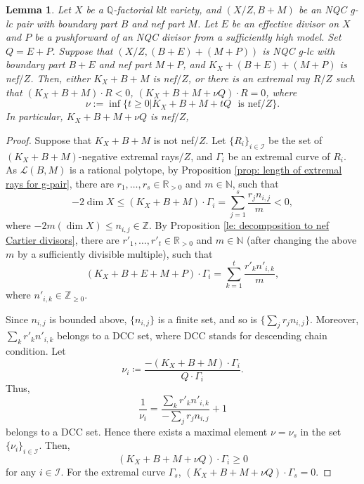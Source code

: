 \documentclass[11pt]{amsart}
\newcommand{\Zz}{\mathbb{Z}}
\newcommand{\Rr}{\mathbb{R}}
\newcommand{\Qq}{\mathbb{Q}}
\newcommand{\Nn}{\mathbb{N}}
\newcommand{\Ii}{\mathcal{I}}
\newcommand{\Ll}{\mathcal{L}}
\newtheorem{lemma}[theorem]{Lemma}
\begin{document}
\begin{lemma}\label{lem:MMPscalingNQC}
	Let $X$ be a $\Qq$-factorial klt variety, and $(X/Z,B+M)$ be an NQC g-lc pair with boundary part $B$ and nef part $M$. Let $E$ be an effective divisor on $X$ and $P$ be a pushforward of an NQC divisor from a sufficiently high model. Set $Q=E+P$. Suppose that $(X/Z,(B+E)+(M+P))$ is NQC g-lc with boundary part $B+E$ and nef part $M+P$, and $K_X+(B+E)+(M+P)$ is nef$/Z$. Then, either $K_X+B+M$ is nef$/Z$, or there is an extremal ray $R/Z$ such that $(K_X+B+M)\cdot R<0$, $(K_X+B+M+\nu Q)\cdot R=0$, where
	\[
	\nu:=\inf\{t\ge0| K_X+B+M+tQ \text{~ is nef}/Z\}.
	\] In particular, $K_X+B+M+\nu Q$ is nef$/Z$, 
\end{lemma}
\begin{proof}
	Suppose that $K_X+B+M$ is not nef$/Z$. Let $\{R_i\}_{i\in\Ii}$ be the set of $(K_X+B+M)$-negative extremal rays$/Z$, and $\Gamma_i$ be an extremal curve of $R_i$. 
	As $\Ll(B, M)$ is a rational polytope, by Proposition \ref{prop: length of extremal rays for g-pair}, there are $r_1,\ldots,r_s \in \Rr_{>0}$ and $m \in \Nn$, such that
	\[-2\dim X\le (K_X+B+M)\cdot\Gamma_i=\sum_{j=1}^s\frac{r_j n_{i,j}}{m}<0,\] where $-2m(\dim X)\le n_{i,j}\in\Zz$. By Proposition \ref{le: decomposition to nef Cartier divisors}, there are $r'_1,\ldots,r'_t \in \Rr_{>0}$ and $m \in \Nn$ (after changing the above $m$ by a sufficiently divisible multiple), such that
	\[(K_X+B+E+M+P)\cdot\Gamma_i=\sum_{k=1}^t \frac{r'_kn'_{i,k}}{m},\] where $n'_{i,k}\in\Zz_{\geq 0}$. 
	
	Since $n_{i,j}$ is bounded above, $\{n_{i,j}\}$ is a finite set, and so is $\{\sum_{j}r_j n_{i,j}\}$. Moreover, $\sum_{k} r'_kn'_{i,k}$ belongs to a DCC set, where DCC stands for descending chain condition.
	Let 
	\[\nu_i\coloneqq\frac{-(K_X+B+M)\cdot \Gamma_i}{Q\cdot \Gamma_i}.\]
	Thus, 
	\[\frac{1}{\nu_i}=\frac{\sum_{k} r'_kn'_{i,k}}{-\sum_{j}r_j n_{i,j}}+1\]
	belongs to a DCC set. Hence there exists a maximal element $\nu=\nu_s$ in the set $\{\nu_i\}_{i\in\Ii}$. Then,
	\[(K_X+B+M+\nu Q)\cdot \Gamma_i\ge0\]
	for any $i\in\Ii$. For the extremal curve $\Gamma_s$,  $(K_X+B+M+\nu Q)\cdot \Gamma_s=0$.	 
\end{proof}
\end{document}
